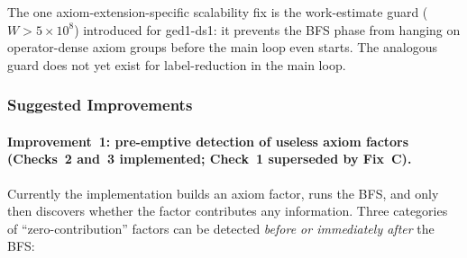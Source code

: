 \documentclass[11pt,a4paper]{article}
\begin{document}
The one axiom-extension-specific scalability fix is the work-estimate guard
($W > 5\times 10^8$) introduced for ged1-ds1: it prevents the BFS phase from
hanging on operator-dense axiom groups before the main loop even starts.
The analogous guard does not yet exist for label-reduction in the main loop.

\subsubsection{Suggested Improvements}

\paragraph{Improvement~1: pre-emptive detection of useless axiom factors
(Checks~2 and~3 implemented; Check~1 superseded by Fix~C).}

Currently the implementation builds an axiom factor, runs the BFS, and only
then discovers whether the factor contributes any information.  Three categories
of ``zero-contribution'' factors can be detected \emph{before or immediately
after} the BFS:
\end{document}
